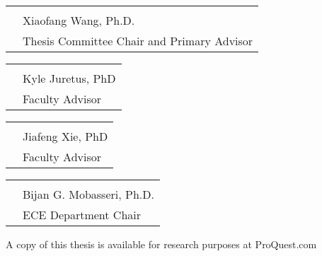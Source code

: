 \begin{tabular}{@{}p{.5in}p{4in}@{}}
& \hrulefill \\
& Xiaofang Wang, Ph.D. \\
& Thesis Committee Chair and Primary Advisor\\
\end{tabular}
\vfill
\begin{tabular}{@{}p{.5in}p{4in}@{}}
& \hrulefill \\
& Kyle Juretus, PhD \\
& Faculty Advisor\\
\end{tabular}
\vfill
\begin{tabular}{@{}p{.5in}p{4in}@{}}
& \hrulefill \\
& Jiafeng Xie, PhD\\
& Faculty Advisor\\
\end{tabular}
\vfill
\noindent
\vspace{.3in}
\begin{tabular}{@{}p{.5in}p{4in}@{}}
& \hrulefill \\
& Bijan G. Mobasseri, Ph.D. \\
& ECE Department Chair\\
\end{tabular}

\vfill
\noindent
A copy of this thesis is available for research purposes at ProQuest.com
\clearpage

